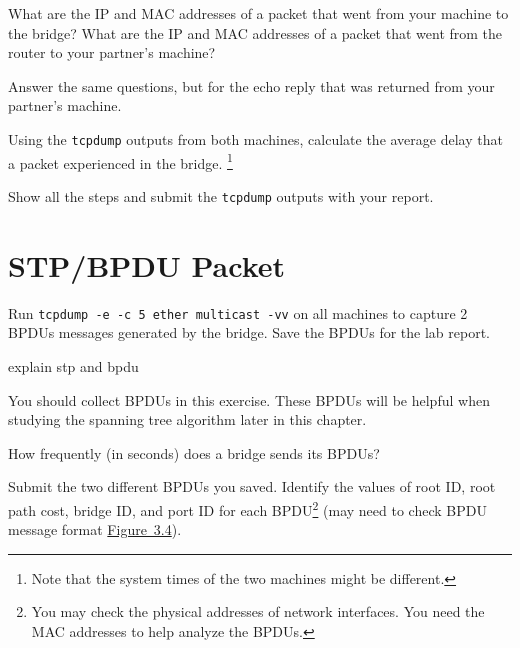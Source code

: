 \documentclass{../UTNetLab}
\begin{document}
    \begin{report}
        \item What are the IP and MAC addresses of a packet that went from your machine to the bridge?
            What are the IP and MAC addresses of a packet that went from the router to your partner’s machine?

        \item Answer the same questions, but for the echo reply that was returned from your partner’s machine.
        
        \item Using the \lstinline{tcpdump} outputs from both machines, calculate the average delay that a packet experienced in the bridge.
            \footnote{Note that the system times of the two machines might be different.}
    \end{report}

    Show all the steps and submit the \lstinline{tcpdump} outputs with your report.

\section{STP/BPDU Packet}
    Run \lstinline{tcpdump -e -c 5 ether multicast -vv} on all machines to capture 2 BPDUs messages generated by the bridge.
    Save the BPDUs for the lab report.

    
explain stp and bpdu

    You should collect BPDUs in this exercise.
    These BPDUs will be helpful when studying the spanning tree algorithm later in this chapter.

    \begin{report}
        \item How frequently (in seconds) does a bridge sends its BPDUs?

        \item Submit the two different BPDUs you saved.
            Identify the values of root ID, root path cost, bridge ID, and port ID for each BPDU\footnote{You may check the physical addresses of network interfaces.
            You need the MAC addresses to help analyze the BPDUs.} (may need to check BPDU message format \hyperref[fig:3.4]{Figure~3.4}).
    \end{report}
\end{document}
